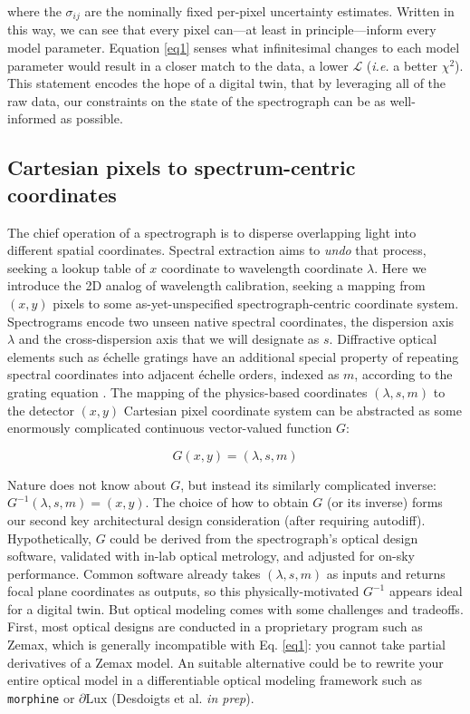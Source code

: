\documentclass[twocolumn]{aastex631}
\begin{document}
where the $\sigma_{ij}$ are the nominally fixed per-pixel uncertainty estimates.  Written in this way, we can see that every pixel can---at least in principle---inform every model parameter.  Equation \ref{eq1} senses what infinitesimal changes to each model parameter would result in a closer match to the data, a lower $\mathcal{L}$ (\emph{i.e.} a better $\chi^2$).  This statement encodes the hope of a digital twin, that by leveraging all of the raw data, our constraints on the state of the spectrograph can be as well-informed as possible.

\subsection{Cartesian pixels to spectrum-centric coordinates}

The chief operation of a spectrograph is to disperse overlapping light into different spatial coordinates.  Spectral extraction aims to \emph{undo} that process, seeking a lookup table of $x$ coordinate to wavelength coordinate $\lambda$.  Here we introduce the 2D analog of wavelength calibration, seeking a mapping from $(x, y)$ pixels to some as-yet-unspecified spectrograph-centric coordinate system.  Spectrograms encode two unseen native spectral coordinates, the dispersion axis $\lambda$ and the cross-dispersion axis that we will designate as $s$.  Diffractive optical elements such as \'echelle gratings have an additional special property of repeating spectral coordinates into adjacent \'echelle orders, indexed as $m$, according to the grating equation \citep{2012sdf..book.....J}.  The mapping of the physics-based coordinates $(\lambda, s, m)$ to the detector $(x, y)$ Cartesian pixel coordinate system can be abstracted as some enormously complicated continuous vector-valued function $G$:

\begin{equation}
  G(x,y) = (\lambda, s, m)
\end{equation}

Nature does not know about $G$, but instead its similarly complicated inverse: $G^{-1}(\lambda, s, m) = (x,y)$.  The choice of how to obtain $G$ (or its inverse) forms our second key architectural design consideration (after requiring autodiff).  Hypothetically, $G$ could be derived from the spectrograph's optical design software, validated with in-lab optical metrology, and adjusted for on-sky performance. Common software already takes $(\lambda, s, m)$ as inputs and returns focal plane coordinates as outputs, so this physically-motivated $G^{-1}$ appears ideal for a digital twin. But optical modeling comes with some challenges and tradeoffs.  First, most optical designs are conducted in a proprietary program such as Zemax\texttrademark, which is generally incompatible with Eq. \ref{eq1}: you cannot take partial derivatives of a Zemax model.  An suitable alternative could be to rewrite your entire optical model in a differentiable optical modeling framework such as \texttt{morphine} \citep{2021ApJ...907...40P} or $\partial{\mathrm{Lux}}$ (Desdoigts et al. \emph{in prep}).
\end{document}
